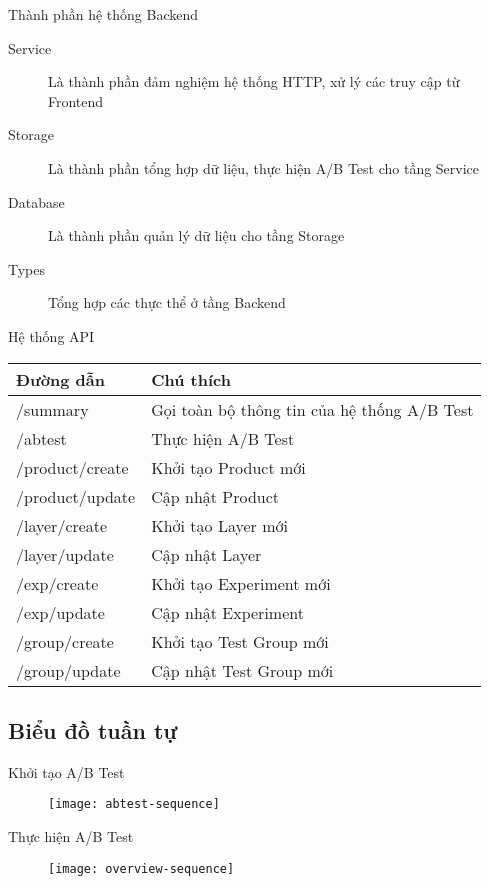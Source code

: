 \begin{frame}{Thành phần hệ thống Backend}
	\begin{description}
		\item[Service] Là thành phần đảm nghiệm hệ thống HTTP, xử lý các truy cập từ Frontend
		\item[Storage] Là thành phần tổng hợp dữ liệu, thực hiện A/B Test cho tầng Service
		\item[Database] Là thành phần quản lý dữ liệu cho tầng Storage
		\item[Types] Tổng hợp các thực thể ở tầng Backend
	\end{description}
\end{frame}

\begin{frame}{Hệ thống API}
	\begin{table}
		\centering
		\begin{tabular}{|l|l|}
			\hline
			\textbf{Đường dẫn} & \textbf{Chú thích}                          \\ \hline
			/summary           & Gọi toàn bộ thông tin của hệ thống A/B Test \\ \hline
			/abtest            & Thực hiện A/B Test                          \\ \hline
			/product/create    & Khởi tạo Product mới                        \\ \hline
			/product/update    & Cập nhật Product                            \\ \hline
			/layer/create      & Khởi tạo Layer mới                          \\ \hline
			/layer/update      & Cập nhật Layer                              \\ \hline
			/exp/create        & Khởi tạo Experiment mới                     \\ \hline
			/exp/update        & Cập nhật Experiment                         \\ \hline
			/group/create      & Khởi tạo Test Group mới                     \\ \hline
			/group/update      & Cập nhật Test Group mới                     \\ \hline
		\end{tabular}
	\end{table}
\end{frame}

\subsection{Biểu đồ tuần tự}

\begin{frame}{Khởi tạo A/B Test}
	\begin{figure}
		\texttt{[image: abtest-sequence]}
	\end{figure}
\end{frame}

\begin{frame}{Thực hiện A/B Test}
	\begin{figure}
		\texttt{[image: overview-sequence]}
	\end{figure}
\end{frame}
